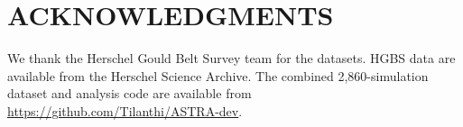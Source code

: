 \documentclass[twocolumn,longtitle,usenatbib]{mnras}
\begin{document}
\section*{ACKNOWLEDGMENTS}

We thank the Herschel Gould Belt Survey team for the datasets. HGBS data are available from the Herschel Science Archive. The combined 2,860-simulation dataset and analysis code are available from \url{https://github.com/Tilanthi/ASTRA-dev}.



\end{document}
